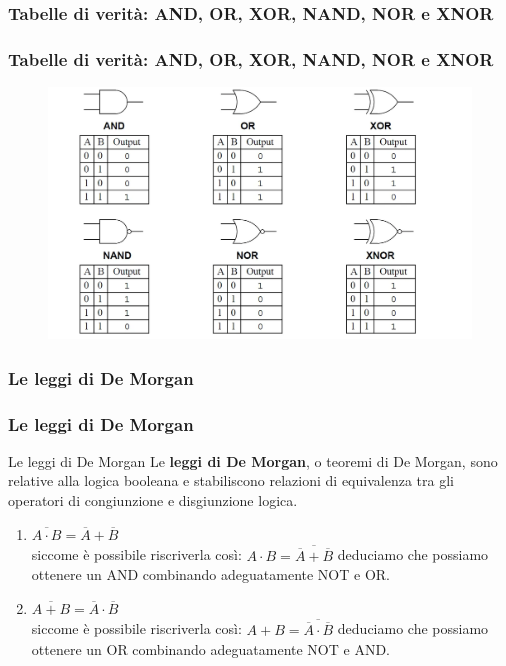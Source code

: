 \subsubsection[Tabelle di verità: AND, OR, XOR, NAND, NOR e XNOR]{Tabelle di verità: AND, OR, XOR, NAND, NOR e XNOR}
\begin{frame}
	\frametitle{Tabelle di verità: AND, OR, XOR, NAND, NOR e XNOR}

	\begin{figure}[!htbp]
		\centering 
		\includegraphics[width=1.0\linewidth]{images/2_le_architetture/logic_gates_truthtables.png}
	\end{figure}
	
\end{frame}


\subsubsection[Le leggi di De Morgan]{Le leggi di De Morgan}
\begin{frame}
	\frametitle{Le leggi di De Morgan}

	\begin{block}{Le leggi di De Morgan}
		Le \textbf{leggi di De Morgan}, o teoremi di De Morgan, sono relative alla logica booleana e stabiliscono relazioni di equivalenza tra gli operatori di congiunzione e disgiunzione logica.\\ \vspace{0.8em}
		
		\begin{enumerate}
			\item $\overline{A \cdot B} = \overline A + \overline B$\\
			siccome è possibile riscriverla così: $A \cdot B = \overline{\overline A + \overline B}$ deduciamo che possiamo ottenere un AND combinando adeguatamente NOT e OR.
			\item $\overline{A + B} = \overline {A} \cdot \overline {B}$	\\
			siccome è possibile riscriverla così: $A + B = \overline{\overline {A} \cdot \overline {B}}$
			deduciamo che possiamo ottenere un OR combinando adeguatamente NOT e AND.
		\end{enumerate}
		
	\end{block}
	
\end{frame}



